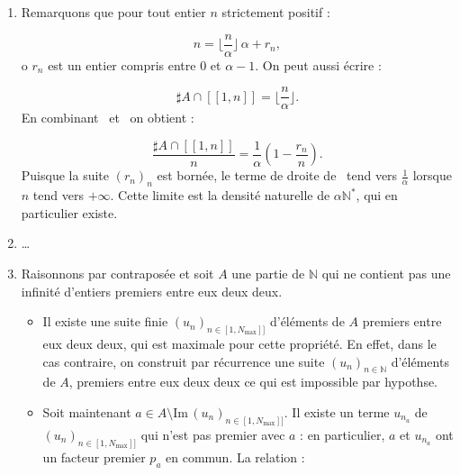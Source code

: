 \begin{sol}
\begin{enumerate}
\item Remarquons que pour tout entier \(n\) strictement positif :

\begin{equation}
n=\lfloor \frac{n}{\alpha} \rfloor \, \alpha + r_n ,
\label{eq:div_alpha_n}
\end{equation}
o \(r_n\) est un entier compris entre \(0\) et \(\alpha-1\). %
On peut aussi \'ecrire :

\begin{equation}
\sharp A \cap [\![1,n]\!] = \lfloor \frac{n}{\alpha} \rfloor.
\label{eq:card_n_sur_alpha}
\end{equation}
En combinant~ et~ on obtient :

\begin{equation}
\dfrac{\sharp A \cap [\![1,n]\!]}{n} = \dfrac{1}{\alpha}\left(1-\frac{r_n}{n}\right) .
\label{eq:dens_n_rn}
\end{equation}
Puisque la suite \((r_n)_n\) est born\'ee, le terme de droite de~ tend vers \(\frac{1}{\alpha}\) lorsque \(n\) tend vers \(+\infty\). %
Cette limite est la densit\'e naturelle de \(\alpha\mathbb{N}^{\ast}\), qui en particulier existe.
\item \dots
\item Raisonnons par contrapos\'ee et soit \(A\) une partie de \(\mathbb{N}\) %
qui ne contient pas une infinit\'e d'entiers premiers entre eux deux  deux.

\begin{itemize}
\item Il existe une suite finie \((u_n)_{n\in \![1,N_{\text{max}}]\!]}\) d'\'el\'ements de \(A\) premiers entre eux deux  deux, %
qui est maximale pour cette propri\'et\'e. %
En effet, dans le cas contraire, on construit par r\'ecurrence une suite \((u_n)_{n\in\mathbb{N}}\) %
d'\'el\'ements de \(A\), premiers entre eux deux  deux ce qui est impossible par hypothse.

\item Soit maintenant \(a\in A \setminus \mathrm{Im}\,(u_n)_{n\in \![1,N_{\text{max}}]\!]}\). %
Il existe un terme \(u_{n_a}\) de \((u_n)_{n\in \![1,N_{\text{max}}]\!]}\) qui n'est pas premier avec \(a\) : %
en particulier, \(a\) et \(u_{n_a}\) ont un facteur premier \(p_a\) en commun. %
La relation :


\end{itemize}
\end{enumerate}
\end{sol}
